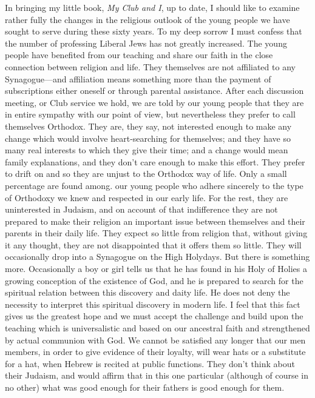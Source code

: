 In bringing my little book, \textsl{My Club and I}, up to date,
I should like to examine rather fully the changes in the
religious outlook of the young people we have sought
to serve during these sixty years. To my deep sorrow I
must confess that the number of professing Liberal Jews
has not greatly increased. The young people have
benefited from our teaching and share our faith in the
close connection between religion and life. They
themselves are not affiliated to any Synagogue—and
affiliation means something more than the payment of
subscriptions either oneself or through parental assistance.
After each discussion meeting, or Club service we
hold, we are told by our young people that they are in
entire sympathy with our point of view, but nevertheless
they prefer to call themselves Orthodox. They are, they
say, not interested enough to make any change which
would involve heart-searching for themselves; and they
have so many real interests to which they give their time;
and a change would mean family explanations, and they
don’t care enough to make this effort. They prefer to
drift on and so they are unjust to the Orthodox way of
life. Only a small percentage are found among. our
young people who adhere sincerely to the type of
Orthodoxy we knew and respected in our early life.
For the rest, they are uninterested in Judaism, and on
account of that indifference they are not prepared to
make their religion an important issue between themselves
and their parents in their daily life. They expect
so little from religion that, without giving it any thought,
they are not disappointed that it offers them so little.
They will occasionally drop into a Synagogue on the
High Holydays. But there is something more. Occasionally
a boy or girl tells us that he has found in his Holy of
Holies a growing conception of the existence of God, and
he is prepared to search for the spiritual relation between
this discovery and daity life. He does not deny the
necessity to interpret this spiritual discovery in modern
life. I feel that this fact gives us the greatest hope and
we must accept the challenge and build upon the
teaching which is universalistic and based on our
ancestral faith and strengthened by actual communion
with God. We cannot be satisfied any longer that our
men members, in order to give evidence of their loyalty,
will wear hats or a substitute for a hat, when Hebrew
is recited at public functions. They don’t think about
their Judaism, and would affirm that in this one
particular (although of course in no other) what was
good enough for their fathers is good enough for them.
